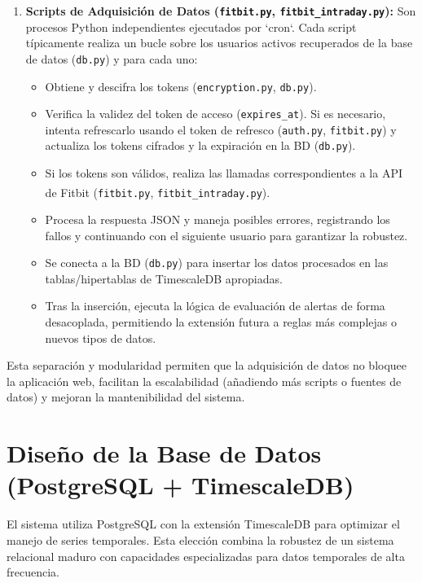 \begin{enumerate}
    \item \textbf{Scripts de Adquisición de Datos (\texttt{fitbit.py}, \texttt{fitbit\_intraday.py}):} Son procesos Python independientes ejecutados por `cron`. Cada script típicamente realiza un bucle sobre los usuarios activos recuperados de la base de datos (\texttt{db.py}) y para cada uno:
        \begin{itemize}
            \item Obtiene y descifra los tokens (\texttt{encryption.py}, \texttt{db.py}).
            \item Verifica la validez del token de acceso (\texttt{expires\_at}). Si es necesario, intenta refrescarlo usando el token de refresco (\texttt{auth.py}, \texttt{fitbit.py}) y actualiza los tokens cifrados y la expiración en la BD (\texttt{db.py}).
            \item Si los tokens son válidos, realiza las llamadas correspondientes a la API de Fitbit\textsuperscript{\textregistered} (\texttt{fitbit.py}, \texttt{fitbit\_intraday.py}).
            \item Procesa la respuesta JSON y maneja posibles errores, registrando los fallos y continuando con el siguiente usuario para garantizar la robustez.
            \item Se conecta a la BD (\texttt{db.py}) para insertar los datos procesados en las tablas/hipertablas de TimescaleDB apropiadas.
            \item Tras la inserción, ejecuta la lógica de evaluación de alertas de forma desacoplada, permitiendo la extensión futura a reglas más complejas o nuevos tipos de datos.
        \end{itemize}
\end{enumerate}
Esta separación y modularidad permiten que la adquisición de datos no bloquee la aplicación web, facilitan la escalabilidad (añadiendo más scripts o fuentes de datos) y mejoran la mantenibilidad del sistema.

\section{Diseño de la Base de Datos (PostgreSQL + TimescaleDB)}
\label{sec:diseno_bd}

El sistema utiliza PostgreSQL con la extensión TimescaleDB para optimizar el manejo de series temporales. Esta elección combina la robustez de un sistema relacional maduro con capacidades especializadas para datos temporales de alta frecuencia.

